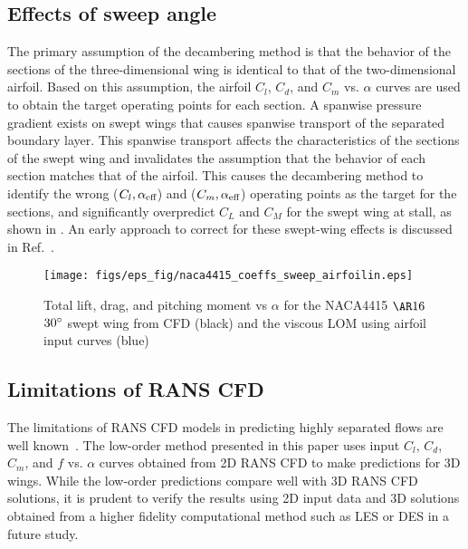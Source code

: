 \subsection{Effects of sweep angle}
The primary assumption of the decambering method is that the behavior of the sections of the three-dimensional wing is identical to that of the two-dimensional airfoil.
Based on this assumption, the airfoil $C_l$, $C_d$, and $C_m$ vs. $\alpha$ curves are used to obtain the target operating points for each section.
A spanwise pressure gradient exists on swept wings that causes spanwise transport of the separated boundary layer.
This spanwise transport affects the characteristics of the sections of the swept wing and invalidates the assumption that the behavior of each section matches that of the airfoil.
This causes the decambering method to identify the wrong ($C_l, \alpha_\text{eff}{}$) and ($C_m, \alpha_\text{eff}{}$) operating points as the target for the sections, and significantly overpredict $C_L$ and $C_M$ for the swept wing at stall, as shown in .
An early approach to correct for these swept-wing effects is discussed in Ref.~\cite{Hosangadi2015}.

\begin{figure}[!h]
    \centering
    \texttt{[image: figs/eps\_fig/naca4415\_coeffs\_sweep\_airfoilin.eps]}
    \caption{Total lift, drag, and pitching moment vs $\alpha$ for the NACA4415 $\ar{16}$ $30^\circ{}$ swept wing from CFD (black) and the viscous LOM using airfoil input curves (blue)}
    \label{fig:n4415-swpwing-limitation}
\end{figure}

\subsection{Limitations of RANS CFD}
The limitations of RANS CFD models in predicting highly separated flows are well known~\cite{Strelets2001,Menter2011}.
The low-order method presented in this paper uses input $C_l$, $C_d$, $C_m$, and $f$ vs. $\alpha$ curves obtained from 2D RANS CFD to make predictions for 3D wings.
While the low-order predictions compare well with 3D RANS CFD solutions, it is prudent to verify the results using 2D input data  and 3D solutions obtained from a higher fidelity computational method such as LES or DES in a future study.

